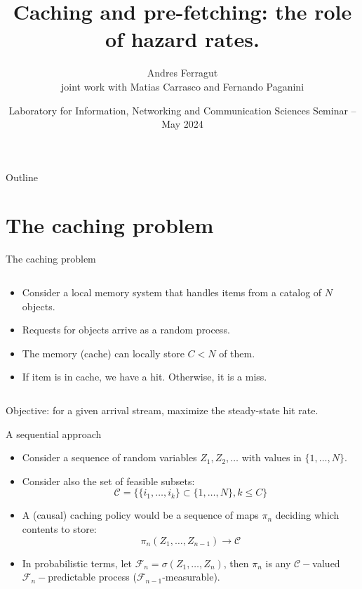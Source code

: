 \documentclass[aspectratio=169]{beamer}
\title{Caching and pre-fetching: the role of hazard rates.}
\author[Andres Ferragut, Universidad ORT Uruguay]{Andres Ferragut\\[.6em] \normalsize joint work with Matias Carrasco and Fernando Paganini}
\institute{Universidad ORT Uruguay}
\date[LINCS Seminar -- May 2024]{Laboratory for Information, Networking and Communication Sciences Seminar -- May 2024}
\newenvironment*{myitem}[1][1.5em]{\begin{itemize}\setlength{\itemsep}{#1}}{\end{itemize}}
\begin{document}
\frame[plain]{\titlepage}

\begin{frame}{Outline}
\tableofcontents
\end{frame}

\section{The caching problem}

\begin{frame}{The caching problem}
	
	\begin{columns}
		\begin{column}{0.61\textwidth}
			\begin{myitem}[2em]
				\item Consider a \alert{local memory system} that handles items from a catalog of $N$ objects.
				\item Requests for objects arrive as a random process.
				\item The memory (cache) can locally store $C<N$ of them.
				\item If item is in cache, we have a \alert{hit}. Otherwise, it is a \alert{miss}.
			\end{myitem}
		\end{column}
		\begin{column}{0.39\textwidth}
			\centering
			
		\end{column}
	\end{columns}

	\vfill

	\centering
	\alert{Objective:} for a given arrival stream, maximize the steady-state \alert{hit rate}.
\end{frame}

\begin{frame}{A sequential approach}

  \begin{myitem}
  \item Consider a sequence of random variables $Z_1,Z_2,\ldots$ with values in $\{1,\ldots,N\}$.
    
  \item Consider also the set of feasible subsets:
   \begin{equation*}
    \mathcal{C} = \{\{i_1,\ldots,i_k\}\subset \{1,\ldots,N\}, k\leqslant C\} 
   \end{equation*}

  \item A (causal) caching policy would be a sequence of maps $\pi_n$ deciding which contents to store:
    \begin{equation*}
      \pi_n(Z_1,\ldots,Z_{n-1}) \to \mathcal{C}
    \end{equation*}

  \item In probabilistic terms, let $\mathcal{F}_n = \sigma(Z_1,\ldots,Z_n)$, then $\pi_n$ is any $\mathcal{C}-$valued $\mathcal{F}_n-$predictable process ($\mathcal{F}_{n-1}$-measurable).
  \end{myitem}


\end{frame}
\end{document}
